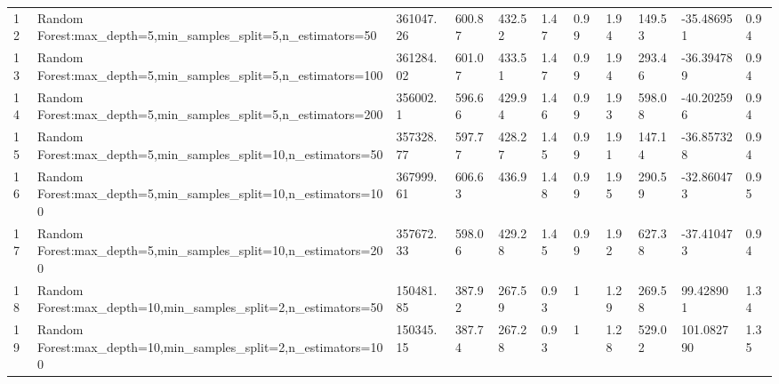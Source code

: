 \begin{longtable}{C{0.8cm} L{2cm} C{1.15cm} C{1.15cm} C{1.15cm} C{1.15cm} C{0.85cm} C{1.25cm} C{1.2cm} C{1.5cm} C{1.0cm}}
12 & Random Forest:\newline max\_depth=5,\newline min\_samples\_split=5,\newline n\_estimators=50 & 361047.26 & 600.87 & 432.52 & 1.47 & 0.99 & 1.94 & 149.53 & -35.486951 & 0.94 \\
13 & Random Forest:\newline max\_depth=5,\newline min\_samples\_split=5,\newline n\_estimators=100 & 361284.02 & 601.07 & 433.51 & 1.47 & 0.99 & 1.94 & 293.46 & -36.394789 & 0.94 \\
14 & Random Forest:\newline max\_depth=5,\newline min\_samples\_split=5,\newline n\_estimators=200 & 356002.1 & 596.66 & 429.94 & 1.46 & 0.99 & 1.93 & 598.08 & -40.202596 & 0.94 \\
15 & Random Forest:\newline max\_depth=5,\newline min\_samples\_split=10,\newline n\_estimators=50 & 357328.77 & 597.77 & 428.27 & 1.45 & 0.99 & 1.91 & 147.14 & -36.857328 & 0.94 \\
16 & Random Forest:\newline max\_depth=5,\newline min\_samples\_split=10,\newline n\_estimators=100 & 367999.61 & 606.63 & 436.9 & 1.48 & 0.99 & 1.95 & 290.59 & -32.860473 & 0.95 \\
17 & Random Forest:\newline max\_depth=5,\newline min\_samples\_split=10,\newline n\_estimators=200 & 357672.33 & 598.06 & 429.28 & 1.45 & 0.99 & 1.92 & 627.38 & -37.410473 & 0.94 \\
18 & Random Forest:\newline max\_depth=10,\newline min\_samples\_split=2,\newline n\_estimators=50 & 150481.85 & 387.92 & 267.59 & 0.93 & 1 & 1.29 & 269.58 & 99.428901 & 1.34 \\
19 & Random Forest:\newline max\_depth=10,\newline min\_samples\_split=2,\newline n\_estimators=100 & 150345.15 & 387.74 & 267.28 & 0.93 & 1 & 1.28 & 529.02 & 101.082790 & 1.35 \\

\end{longtable}

